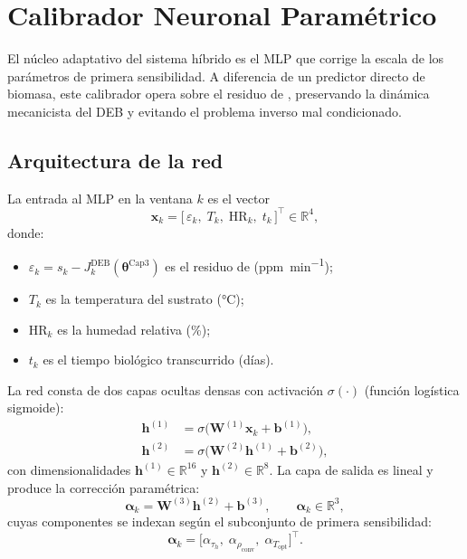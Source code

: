 \section{Calibrador Neuronal Paramétrico}
\label{sec:cap4_calibrador}

El núcleo adaptativo del sistema híbrido es el MLP que corrige la escala de los parámetros de primera sensibilidad. A diferencia de un predictor directo de biomasa, este calibrador opera sobre el residuo de , preservando la dinámica mecanicista del DEB y evitando el problema inverso mal condicionado.

\subsection{Arquitectura de la red}

La entrada al MLP en la ventana $k$ es el vector
\begin{equation}
\mathbf{x}_k = \bigl[\,\varepsilon_k,\;T_k,\;\mathrm{HR}_k,\;t_k\,\bigr]^{\top} \in \mathbb{R}^{4},
\label{eq:mlp_entrada}
\end{equation}
donde:
\begin{itemize}
\item $\varepsilon_k = s_k - J_k^{\mathrm{DEB}}(\boldsymbol{\theta}^{\mathrm{Cap3}})$ es el residuo de  (\si{ppm\per\minute});
\item $T_k$ es la temperatura del sustrato (\si{\celsius});
\item $\mathrm{HR}_k$ es la humedad relativa (\%);
\item $t_k$ es el tiempo biológico transcurrido (días).
\end{itemize}

La red consta de dos capas ocultas densas con activación $\sigma(\cdot)$ (función logística sigmoide):
\begin{align}
\mathbf{h}^{(1)} &= \sigma\bigl(\mathbf{W}^{(1)}\mathbf{x}_k + \mathbf{b}^{(1)}\bigr), \\
\mathbf{h}^{(2)} &= \sigma\bigl(\mathbf{W}^{(2)}\mathbf{h}^{(1)} + \mathbf{b}^{(2)}\bigr),
\end{align}
con dimensionalidades $\mathbf{h}^{(1)} \in \mathbb{R}^{16}$ y $\mathbf{h}^{(2)} \in \mathbb{R}^{8}$. La capa de salida es lineal y produce la corrección paramétrica:
\begin{equation}
\boldsymbol{\alpha}_k = \mathbf{W}^{(3)}\mathbf{h}^{(2)} + \mathbf{b}^{(3)},
\qquad
\boldsymbol{\alpha}_k \in \mathbb{R}^{3},
\label{eq:mlp_salida}
\end{equation}
cuyas componentes se indexan según el subconjunto de primera sensibilidad:
\begin{equation}
\boldsymbol{\alpha}_k = \bigl[\alpha_{\tau_h},\;\alpha_{\rho_{\mathrm{conv}}},\;\alpha_{T_{\mathrm{opt}}}\bigr]^{\top}.
\end{equation}

